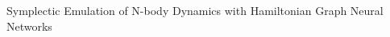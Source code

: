 \documentclass[]{article}
\begin{document}
Symplectic Emulation of N-body Dynamics with Hamiltonian Graph Neural Networks
\end{document}
